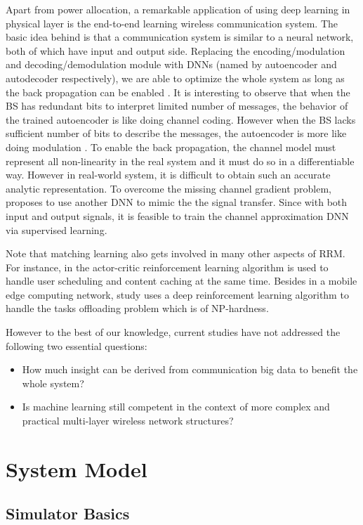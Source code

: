 \documentclass[journal]{IEEEtran}
\begin{document}
	Apart from power allocation, a remarkable application of using deep learning in physical layer is the end-to-end learning wireless communication system. The basic idea behind is that a communication system is similar to a neural network, both of which have input and output side. Replacing the encoding/modulation and decoding/demodulation module with DNNs (named by autoencoder and autodecoder respectively), we are able to optimize the whole system as long as the back propagation can be enabled . It is interesting to observe that when the BS has redundant bits to interpret limited number of messages, the behavior of the trained autoencoder is like doing channel coding. However when the BS lacks sufficient number of bits to describe the messages, the autoencoder is more like doing modulation \cite{o2017introduction,o2017deep}. To enable the back propagation, the channel model must represent all non-linearity in the real system and it must do so in a differentiable way. However in real-world system, it is difficult to obtain such an accurate analytic representation. To overcome the missing channel gradient problem, \cite{o2018physical} proposes to use another DNN to mimic the the signal transfer. Since with both input and output signals, it is feasible to  train the channel approximation DNN via supervised learning. 
	
	Note that matching learning also gets involved in many other aspects of RRM.  For instance, in \cite{wei2018joint} the actor-critic reinforcement learning algorithm is used to handle user scheduling and content caching at the same time. Besides in a mobile edge computing network, study \cite{huang2019deep} uses a deep reinforcement learning algorithm to handle the tasks offloading problem which is of NP-hardness.
	
	However to the best of our knowledge, current studies have not addressed the following two essential questions:
	\begin{itemize}
		\item How much insight can be derived from communication big data to benefit the whole system?
		\item Is machine learning still competent in the context of more complex and practical multi-layer wireless network structures?
	\end{itemize}
	
\section{System Model}
\subsection{Simulator Basics}\label{setup}
\end{document}
